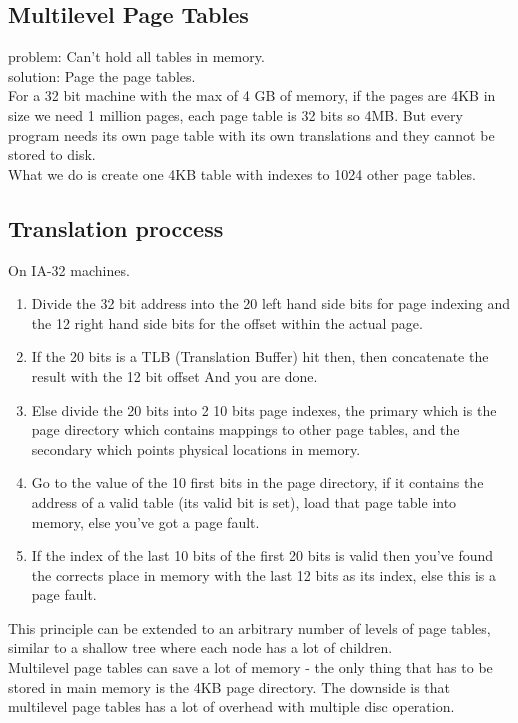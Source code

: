 \subsection*{Multilevel Page Tables}
problem: Can't hold all tables in memory. \\
solution: Page the page tables. \\
For a 32 bit machine with the max of 4 GB of memory, if the pages are 4KB in size we need 1 million pages, each page table is 32 bits so 4MB. But every program needs its own page table with its own translations and they cannot be stored to disk. \\
What we do is create one 4KB table with indexes to 1024 other page tables. 
\subsection*{Translation proccess}
On IA-32 machines.
\begin{enumerate}
\item Divide the 32 bit address into the 20 left hand side bits for page indexing and the 12 right hand side bits for the offset within the actual page.
\item If the 20 bits is a TLB (Translation Buffer) hit then, then concatenate the result with the 12 bit offset And you are done.
\item Else divide the 20 bits into 2 10 bits page indexes, the primary which is the page directory which contains mappings to other page tables, and the secondary which points physical locations in memory.
\item Go to the value of the 10 first bits in the page directory, if it contains the address of a valid table (its valid bit is set), load that page table into memory, else you've got a page fault.
\item If the index of the last 10 bits of the first 20 bits is valid then you've found the corrects place in memory with the last 12 bits as its index, else this is a page fault.
\end{enumerate}
This principle can be extended to an arbitrary number of levels of page tables, similar to a shallow tree where each node has a lot of children. \\
Multilevel page tables can save a lot of memory - the only thing that has to be stored in main memory is the 4KB page directory. The downside is that multilevel page tables has a lot of overhead with multiple disc operation. 